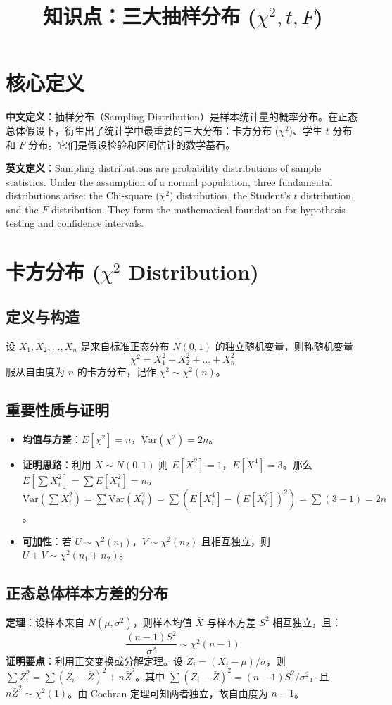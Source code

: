 \documentclass[12pt, a4paper]{article}
\title{知识点：三大抽样分布 ($\chi^2, t, F$)}
\author{}
\date{}
\begin{document}
\maketitle

\section{核心定义}
\textbf{中文定义}：抽样分布（Sampling Distribution）是样本统计量的概率分布。在正态总体假设下，衍生出了统计学中最重要的三大分布：卡方分布 ($\chi^2$)、学生 $t$ 分布和 $F$ 分布。它们是假设检验和区间估计的数学基石。

\textbf{英文定义}：Sampling distributions are probability distributions of sample statistics. Under the assumption of a normal population, three fundamental distributions arise: the Chi-square ($\chi^2$) distribution, the Student's $t$ distribution, and the $F$ distribution. They form the mathematical foundation for hypothesis testing and confidence intervals.

\section{卡方分布 ($\chi^2$ Distribution)}

\subsection{定义与构造}
设 $X_1, X_2, \dots, X_n$ 是来自标准正态分布 $N(0, 1)$ 的独立随机变量，则称随机变量
$$ \chi^2 = X_1^2 + X_2^2 + \dots + X_n^2 $$
服从自由度为 $n$ 的卡方分布，记作 $\chi^2 \sim \chi^2(n)$。

\subsection{重要性质与证明}
\begin{itemize}
    \item \textbf{均值与方差}：$E[\chi^2] = n$，$\text{Var}(\chi^2) = 2n$。
    \item \textbf{证明思路}：利用 $X \sim N(0, 1)$ 则 $E[X^2] = 1$，$E[X^4] = 3$。那么 $E[\sum X_i^2] = \sum E[X_i^2] = n$。$\text{Var}(\sum X_i^2) = \sum \text{Var}(X_i^2) = \sum (E[X_i^4] - (E[X_i^2])^2) = \sum (3-1) = 2n$。
    \item \textbf{可加性}：若 $U \sim \chi^2(n_1)$，$V \sim \chi^2(n_2)$ 且相互独立，则 $U+V \sim \chi^2(n_1+n_2)$。
\end{itemize}

\subsection{正态总体样本方差的分布}
\textbf{定理}：设样本来自 $N(\mu, \sigma^2)$，则样本均值 $\bar{X}$ 与样本方差 $S^2$ 相互独立，且：
$$ \frac{(n-1)S^2}{\sigma^2} \sim \chi^2(n-1) $$
\textbf{证明要点}：利用正交变换或分解定理。设 $Z_i = (X_i - \mu)/\sigma$，则 $\sum Z_i^2 = \sum (Z_i - \bar{Z})^2 + n\bar{Z}^2$。其中 $\sum (Z_i - \bar{Z})^2 = (n-1)S^2/\sigma^2$，且 $n\bar{Z}^2 \sim \chi^2(1)$。由 Cochran 定理可知两者独立，故自由度为 $n-1$。
\end{document}
